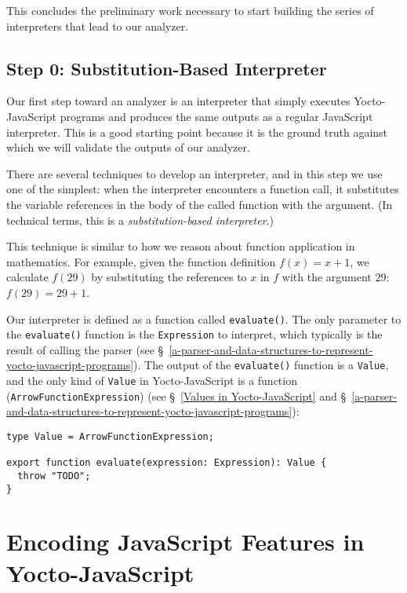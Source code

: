 \documentclass[12pt, oneside]{book}
\begin{document}
This concludes the preliminary work necessary to start building the series of interpreters that lead to our analyzer.

\section{Step 0: Substitution-Based Interpreter}

Our first step toward an analyzer is an interpreter that simply executes Yocto-JavaScript programs and produces the same outputs as a regular JavaScript interpreter. This is a good starting point because it is the ground truth against which we will validate the outputs of our analyzer.

There are several techniques to develop an interpreter, and in this step we use one of the simplest: when the interpreter encounters a function call, it substitutes the variable references in the body of the called function with the argument. (In technical terms, this is a \emph{substitution-based interpreter}.)

This technique is similar to how we reason about function application in mathematics. For example, given the function definition $f(x) = x + 1$, we calculate $f(29)$ by substituting the references to $x$ in $f$ with the argument $29$: $f(29) = 29 + 1$.

Our interpreter is defined as a function called \texttt{evaluate()}. The only parameter to the \texttt{evaluate()} function is the \texttt{Expression} to interpret, which typically is the result of calling the parser (see §~\ref{a-parser-and-data-structures-to-represent-yocto-javascript-programs}). The output of the \texttt{evaluate()} function is a \texttt{Value}, and the only kind of \texttt{Value} in Yocto-JavaScript is a function (\texttt{ArrowFunctionExpression}) (see §~\ref{Values in Yocto-JavaScript} and §~\ref{a-parser-and-data-structures-to-represent-yocto-javascript-programs}):

\begin{verbatim}
type Value = ArrowFunctionExpression;

export function evaluate(expression: Expression): Value {
  throw "TODO";
}
\end{verbatim}


\appendix

\chapter{Encoding JavaScript Features in Yocto-JavaScript}
\label{encoding-javascript-features-in-yocto-javascript}
\end{document}
